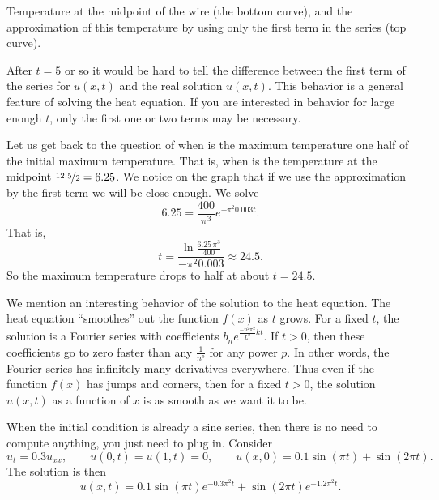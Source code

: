 \documentclass{ximera}
\begin{document}
\begin{exampleSol}
    \begin{myfig}
        \capstart
        \caption{Temperature at the midpoint of the wire (the bottom curve), and the approximation of this temperature by using only the first term in the series (top curve).\label{heat:wireexmaxfig}}
    \end{myfig}
    
    After $t=5$ or so it would be hard to tell the difference between the first term of the series for $u(x,t)$ and the real solution $u(x,t)$.  This behavior is a general feature of solving the heat equation. If you are interested in behavior for large enough $t$, only the first one or two terms may be necessary.
    
    Let us get back to the question of when is the maximum temperature one half of the initial maximum temperature.  That is, when is the temperature at the midpoint $\nicefrac{12.5}{2} = 6.25$.  We notice on the graph that if we use the approximation by the first term we will be close enough.  We solve
    \begin{equation*}
        6.25 = \frac{400}{\pi^3} e^{-\pi^2 0.003 t} .
    \end{equation*}
    That is,
    \begin{equation*}
        t = \frac{\ln \frac{6.25\,\pi^3}{400}}{-\pi^2 0.003} \approx 24.5 .
    \end{equation*}
    So the maximum temperature drops to half at about $t=24.5$.
\end{exampleSol}

We mention an interesting behavior of the solution to the heat equation. The heat equation ``smoothes'' out the function $f(x)$ as $t$ grows.  For a fixed $t$, the solution is a Fourier series with coefficients $b_n e^{\frac{-n^2 \pi^2}{L^2} k t}$.  If $t > 0$, then these coefficients go to zero faster than any $\frac{1}{n^p}$ for any power $p$.  In other words, the Fourier series has infinitely many derivatives everywhere. Thus even if the function $f(x)$ has jumps and corners, then for a fixed $t > 0$, the solution $u(x,t)$ as a function of $x$ is as smooth as we want it to be.

\begin{example}
    When the initial condition is already a sine series, then there is no need to compute anything, you just need to plug in.  Consider
    \begin{equation*}
        u_t = 0.3 u_{xx}, \qquad u(0,t)=u(1,t)=0, \qquad u(x,0) = 0.1 \sin(\pi t) + \sin(2\pi t) .
    \end{equation*}
    The solution is then
    \begin{equation*}
        u(x,t) = 0.1 \sin(\pi t) e^{- 0.3 \pi^2 t} + \sin(2 \pi t) e^{- 1.2 \pi^2 t} .
    \end{equation*}
\end{example}
\end{document}
